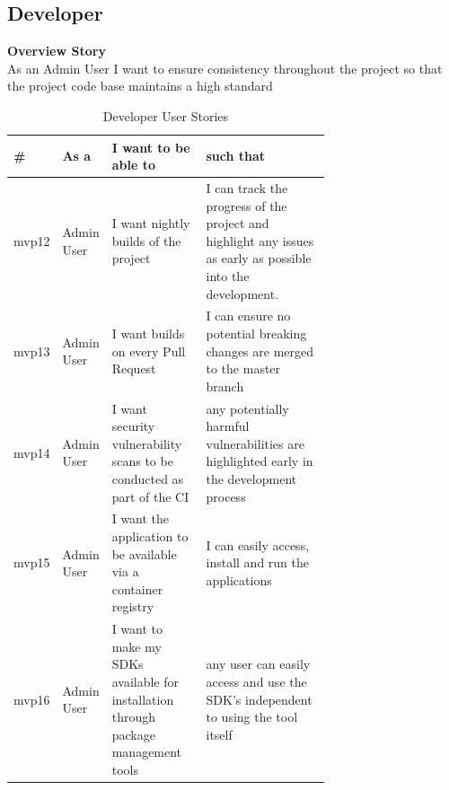 \subsection{Developer}
\textbf{Overview Story}
\\As an Admin User I want to ensure consistency throughout the project so that the project code base maintains a high standard
\begin{table}[!ht]
\begin{tabular}{|l|l|p{0.3\linewidth}|p{0.4\linewidth}|}
\hline
\textbf{\#} & \textbf{As a} & \textbf{I want to be able to}                                                      & \textbf{such that}                                                                                          \\ \hline
mvp12       & Admin User    & I want nightly builds of the project                                               & I can track the progress of the project and highlight any issues as early as possible into the development. \\ \hline
mvp13       & Admin User    & I want builds on every Pull Request                                                & I can ensure no potential breaking changes are merged to the master branch                                  \\ \hline
mvp14       & Admin User    & I want security vulnerability scans to be conducted as part of the CI              & any potentially harmful vulnerabilities are highlighted early in the development process                    \\ \hline
mvp15       & Admin User    & I want the application to be available via a container registry                    & I can easily access, install and run the applications                                                       \\ \hline
mvp16       & Admin User    & I want to make my SDKs available for installation through package management tools & any user can easily access and use the SDK's independent to using the tool itself                           \\ \hline
\end{tabular}
\caption{Developer User Stories}
\label{tab:dev}
\end{table}

\newpage
